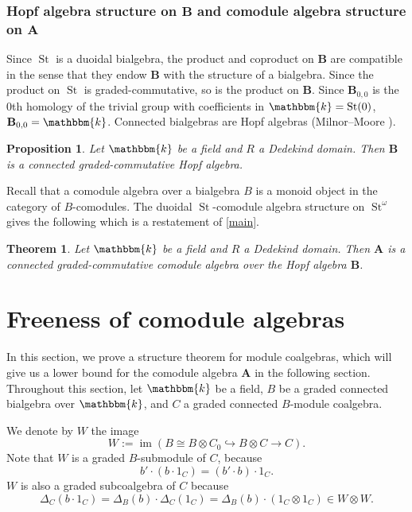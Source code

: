\documentclass[11pt,letterpaper]{amsart}
\newcommand{\bk}{\mathbbm{k}}
\DeclareMathOperator{\Sp}{Sp}
\newcommand{\HH}{\mathbf{B}}
\newcommand{\HA}{\mathbf{A}}
\newcommand{\Z}{\mathbb{Z}}
\newcommand{\Q}{\mathbb{Q}}
\numberwithin{theoremcounter}{section}
\newtheorem{theorem}[theoremauto]{Theorem}
\newtheorem{proposition}[propositionauto]{Proposition}
\theoremstyle{definition}
\theoremstyle{remark}
\DeclareMathOperator{\St}{St}
\DeclareMathOperator{\im}{im}
\begin{document}
\subsubsection{Hopf algebra structure on $\HH$ and comodule algebra structure on $\HA$}

Since $\St$ is a duoidal bialgebra, the product and coproduct on $\HH$ are compatible in the sense that they endow $\HH$ with the structure of a  bialgebra. Since the product on $\St$ is  graded-commutative, so is the product on $\HH$. Since $\HH_{0,0}$ is the $0$th homology of the trivial group with coefficients in $\bk=\St(0)$, $\HH_{0,0}=\bk$. Connected bialgebras are Hopf algebras (Milnor--Moore \cite[Proposition 8.2]{MM}). 

\begin{proposition}
    Let $\bk$ be a field and $R$ a Dedekind domain. Then $\HH$ is a connected  graded-commutative Hopf algebra.
\end{proposition}
Recall that a comodule algebra over a bialgebra $B$ is a monoid object in the category of $B$-comodules. The duoidal $\St$-comodule algebra structure on $\St^\omega$ gives the following which is a restatement of \autoref{main}.

\begin{theorem}
    Let $\bk$ be a field and $R$ a Dedekind domain. Then $\HA$ is a connected graded-commutative comodule algebra over the Hopf algebra $\HH$. 
\end{theorem}

\section{Freeness of comodule algebras}
\label{SecFree}
In this section, we prove a structure theorem for module coalgebras, which will give us a lower bound for the comodule algebra $\HA$ in the following section. 
Throughout this section, let $\bk$ be a field, $B$ be a graded connected bialgebra over $\bk$, and $C$ a graded connected $B$-module coalgebra. 

We denote by $W$ the image
\[W:= \im( B \cong B \otimes C_0 \hookrightarrow
B \otimes C \to C). \]
Note that $W$ is a graded $B$-submodule of $C$, because 
\[ b' \cdot ( b\cdot 1_C) = (b' \cdot b)  \cdot 1_C .\]
$W$ is also a graded subcoalgebra of $C$ because
\[ \Delta_C(b \cdot 1_C) = \Delta_B(b) \cdot \Delta_C(1_C) = \Delta_B(b) \cdot (1_C \otimes 1_C) \in W \otimes W.\]
\end{document}
